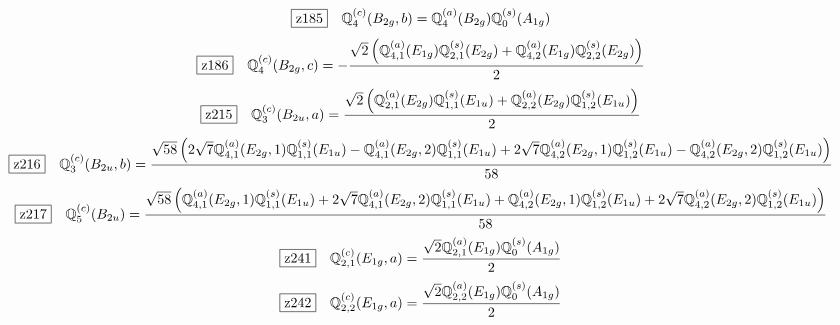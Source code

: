 \documentclass[fleqn,10pt,landscape]{jsarticle}
\begin{document}
\begin{dmath*}
\hspace*{3mm}\fbox{z185}\quad \mathbb{Q}_{4}^{(c)}(B_{2g},b)=\mathbb{Q}_{4}^{(a)}(B_{2g}) \mathbb{Q}_{0}^{(s)}(A_{1g})
\end{dmath*}
\begin{dmath*}
\hspace*{3mm}\fbox{z186}\quad \mathbb{Q}_{4}^{(c)}(B_{2g},c)=- \frac{\sqrt{2} \left(\mathbb{Q}_{4,1}^{(a)}(E_{1g}) \mathbb{Q}_{2,1}^{(s)}(E_{2g}) + \mathbb{Q}_{4,2}^{(a)}(E_{1g}) \mathbb{Q}_{2,2}^{(s)}(E_{2g})\right)}{2}
\end{dmath*}
\begin{dmath*}
\hspace*{3mm}\fbox{z215}\quad \mathbb{Q}_{3}^{(c)}(B_{2u},a)=\frac{\sqrt{2} \left(\mathbb{Q}_{2,1}^{(a)}(E_{2g}) \mathbb{Q}_{1,1}^{(s)}(E_{1u}) + \mathbb{Q}_{2,2}^{(a)}(E_{2g}) \mathbb{Q}_{1,2}^{(s)}(E_{1u})\right)}{2}
\end{dmath*}
\begin{dmath*}
\hspace*{3mm}\fbox{z216}\quad \mathbb{Q}_{3}^{(c)}(B_{2u},b)=\frac{\sqrt{58} \left(2 \sqrt{7} \mathbb{Q}_{4,1}^{(a)}(E_{2g},1) \mathbb{Q}_{1,1}^{(s)}(E_{1u}) - \mathbb{Q}_{4,1}^{(a)}(E_{2g},2) \mathbb{Q}_{1,1}^{(s)}(E_{1u}) + 2 \sqrt{7} \mathbb{Q}_{4,2}^{(a)}(E_{2g},1) \mathbb{Q}_{1,2}^{(s)}(E_{1u}) - \mathbb{Q}_{4,2}^{(a)}(E_{2g},2) \mathbb{Q}_{1,2}^{(s)}(E_{1u})\right)}{58}
\end{dmath*}
\begin{dmath*}
\hspace*{3mm}\fbox{z217}\quad \mathbb{Q}_{5}^{(c)}(B_{2u})=\frac{\sqrt{58} \left(\mathbb{Q}_{4,1}^{(a)}(E_{2g},1) \mathbb{Q}_{1,1}^{(s)}(E_{1u}) + 2 \sqrt{7} \mathbb{Q}_{4,1}^{(a)}(E_{2g},2) \mathbb{Q}_{1,1}^{(s)}(E_{1u}) + \mathbb{Q}_{4,2}^{(a)}(E_{2g},1) \mathbb{Q}_{1,2}^{(s)}(E_{1u}) + 2 \sqrt{7} \mathbb{Q}_{4,2}^{(a)}(E_{2g},2) \mathbb{Q}_{1,2}^{(s)}(E_{1u})\right)}{58}
\end{dmath*}
\begin{dmath*}
\hspace*{3mm}\fbox{z241}\quad \mathbb{Q}_{2,1}^{(c)}(E_{1g},a)=\frac{\sqrt{2} \mathbb{Q}_{2,1}^{(a)}(E_{1g}) \mathbb{Q}_{0}^{(s)}(A_{1g})}{2}
\end{dmath*}
\begin{dmath*}
\hspace*{3mm}\fbox{z242}\quad \mathbb{Q}_{2,2}^{(c)}(E_{1g},a)=\frac{\sqrt{2} \mathbb{Q}_{2,2}^{(a)}(E_{1g}) \mathbb{Q}_{0}^{(s)}(A_{1g})}{2}
\end{dmath*}
\end{document}
